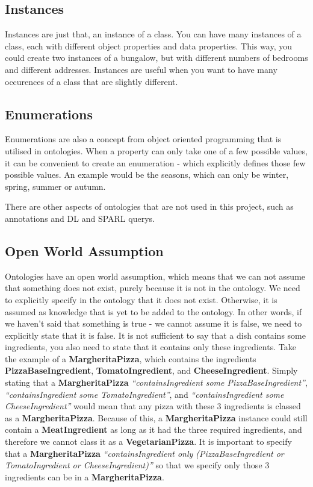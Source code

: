 \subsection{Instances}

Instances are just that, an instance of a class. You can have many instances of a class, each with different object properties and data properties. This way, you could create two instances of a bungalow, but with different numbers of bedrooms and different addresses. Instances are useful when you want to have many occurences of a class that are slightly different.

\subsection{Enumerations}

Enumerations are also a concept from object oriented programming that is utilised in ontologies. When a property can only take one of a few possible values, it can be convenient to create an enumeration - which explicitly defines those few possible values. An example would be the seasons, which can only be winter, spring, summer or autumn.

There are other aspects of ontologies that are not used in this project, such as annotations and DL and SPARL querys.

\subsection{Open World Assumption}

Ontologies have an open world assumption, which means that we can not assume that something does not exist, purely because it is not in the ontology. We need to explicitly specify in the ontology that it does not exist. Otherwise, it is assumed as knowledge that is yet to be added to the ontology. In other words, if we haven't said that something is true - we cannot assume it is false, we need to explicitly state that it is false. It is not sufficient to say that a dish contains some ingredients, you also need to state that it contains only these ingredients. Take the example of a \textbf{MargheritaPizza}, which contains the ingredients \textbf{PizzaBaseIngredient}, \textbf{TomatoIngredient}, and \textbf{CheeseIngredient}. Simply stating that a \textbf{MargheritaPizza} \textit{``containsIngredient some PizzaBaseIngredient''}, \textit{``containsIngredient some TomatoIngredient''}, and \textit{``containsIngredient some CheeseIngredient''} would mean that any pizza with these 3 ingredients is classed as a \textbf{MargheritaPizza}. Because of this, a \textbf{MargheritaPizza} instance could still contain a \textbf{MeatIngredient} as long as it had the three required ingredients, and therefore we cannot class it as a \textbf{VegetarianPizza}. It is important to specify that a \textbf{MargheritaPizza} \textit{``containsIngredient only (PizzaBaseIngredient or TomatoIngredient or CheeseIngredient)''} so that we specify only those 3 ingredients can be in a \textbf{MargheritaPizza}. 

